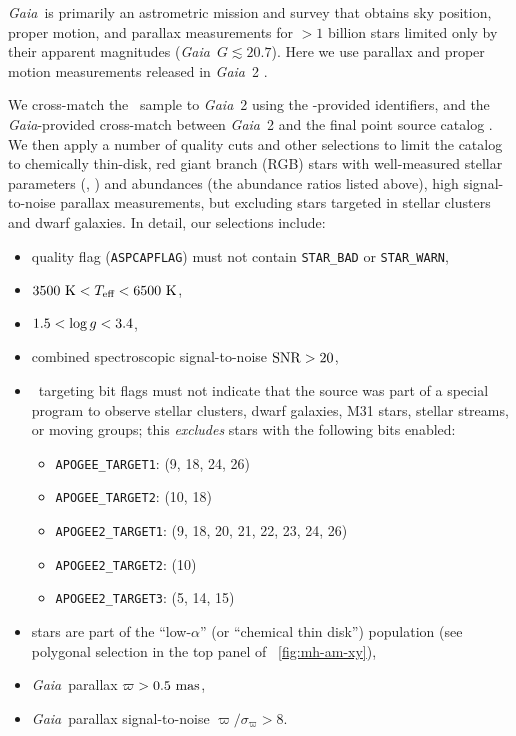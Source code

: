 \documentclass[modern]{aastex63}
\newcommand{\gaia}{\textsl{Gaia}}
\newcommand{\dr}[1]{\acronym{DR}#1}
\newcommand{\apogee}{\acronym{APOGEE}}
\begin{document}
\gaia\ is primarily an astrometric mission and survey
\citep{Gaia-Collaboration:2016} that obtains sky position, proper motion, and
parallax measurements for $>1$ billion stars limited only by their apparent
magnitudes (\gaia\ $G \lesssim 20.7$).
Here we use parallax and proper motion measurements released in \gaia\ \dr{2}
\citep{Gaia-Collaboration:2018, Gaia-astrometric:2018}.

We cross-match the \apogee\ sample to \gaia\ \dr{2} using the \apogee-provided
 \citep{Skrutskie:2006} identifiers, and the \gaia-provided
cross-match between \gaia\ \dr{2} and the final  point source
catalog \citep{Gaia-crossmatch:2019}.
We then apply a number of quality cuts and other selections to limit the catalog
to chemically thin-disk, red giant branch (RGB) stars with well-measured stellar
parameters (\logg, \Teff) and abundances (the abundance ratios listed above),
high signal-to-noise parallax measurements, but excluding stars targeted in
stellar clusters and dwarf galaxies.
In detail, our selections include:
\begin{itemize}
  \item {} quality flag (\texttt{ASPCAPFLAG}) must not contain
    \texttt{STAR\_BAD} or \texttt{STAR\_WARN},
  \item $3500~\mathrm{K} < T_{\textrm{eff}} < 6500~\mathrm{K}$,
  \item $1.5 < \log g < 3.4$,
  \item combined spectroscopic signal-to-noise ${\rm SNR} > 20$,
  \item \apogee\ targeting bit flags must not indicate that the source was part
    of a special program to observe stellar clusters, dwarf galaxies, M31 stars,
    stellar streams, or moving groups; this \emph{excludes} stars with the
    following bits enabled:
    \begin{itemize}
      \item \texttt{APOGEE\_TARGET1}: (9, 18, 24, 26)
      \item \texttt{APOGEE\_TARGET2}: (10, 18)
      \item \texttt{APOGEE2\_TARGET1}: (9, 18, 20, 21, 22, 23, 24, 26)
      \item \texttt{APOGEE2\_TARGET2}: (10)
      \item \texttt{APOGEE2\_TARGET3}: (5, 14, 15)
    \end{itemize}
  \item stars are part of the ``low-$\alpha$'' (or ``chemical thin disk'')
    population (see polygonal selection in the top panel of
    \figurename~\ref{fig:mh-am-xy}),
  \item \gaia\ parallax $\varpi > 0.5~\mathrm{mas}$,
  \item \gaia\ parallax signal-to-noise $\varpi / \sigma_\varpi > 8$.
\end{itemize}
\end{document}

